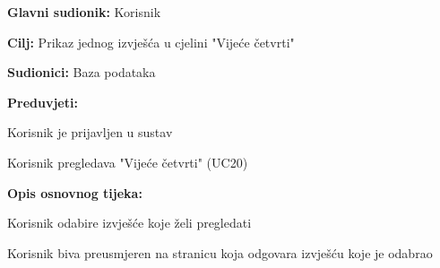 					\noindent {}
					\begin{packed_item}
	
						\item \textbf{Glavni sudionik: }Korisnik
						\item  \textbf{Cilj:} Prikaz jednog izvješća u cjelini "Vijeće četvrti"
						\item  \textbf{Sudionici:} Baza podataka
						\item  \textbf{Preduvjeti:}
						\item[] \begin{packed_enum}
							\item Korisnik je prijavljen u sustav
							\item Korisnik pregledava "Vijeće četvrti" (UC20)
						\end{packed_enum}
						\item  \textbf{Opis osnovnog tijeka:}
						
						\item[] \begin{packed_enum}
	
							\item Korisnik odabire izvješće koje želi pregledati 
							\item Korisnik biva preusmjeren na stranicu koja odgovara izvješću koje je odabrao
							
							
						\end{packed_enum}

						
					\end{packed_item}							
								
